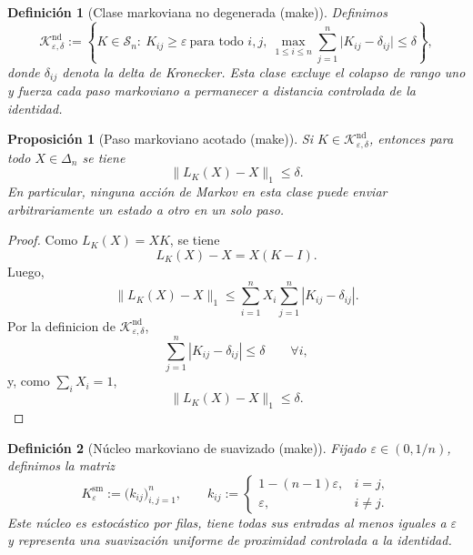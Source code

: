 ﻿\documentclass[12pt]{article}
\newcommand{\fuente}[1]{\textnormal{(#1)}}
\newtheorem{definicion}{Definición}[section]
\newtheorem{proposicion}{Proposición}[section]
\begin{document}
\begin{definicion}[Clase markoviana no degenerada \fuente{make}]
Definimos
\[
\mathcal K_{\varepsilon,\delta}^{\mathrm{nd}}
:=
\left\{
K\in\mathcal S_n:\ 
K_{ij}\ge \varepsilon\ \text{para todo }i,j,
\ \max_{1\le i\le n}\sum_{j=1}^n \bigl|K_{ij}-\delta_{ij}\bigr|\le \delta
\right\},
\]
donde \(\delta_{ij}\) denota la delta de Kronecker. Esta clase excluye el colapso de rango uno y fuerza cada paso markoviano a permanecer a distancia controlada de la identidad.
\end{definicion}

\begin{proposicion}[Paso markoviano acotado \fuente{make}]
Si \(K\in\mathcal K_{\varepsilon,\delta}^{\mathrm{nd}}\), entonces para todo \(X\in\Delta_n\) se tiene
\[
\|L_K(X)-X\|_1\le \delta.
\]
En particular, ninguna acción de Markov en esta clase puede enviar arbitrariamente un estado a otro en un solo paso.
\end{proposicion}

\begin{proof}
Como \(L_K(X)=XK\), se tiene
\[
L_K(X)-X=X(K-I).
\]
Luego,
\[
\|L_K(X)-X\|_1
\le
\sum_{i=1}^n X_i\sum_{j=1}^n |K_{ij}-\delta_{ij}|.
\]
Por la definicion de \(\mathcal K_{\varepsilon,\delta}^{\mathrm{nd}}\),
\[
\sum_{j=1}^n |K_{ij}-\delta_{ij}|\le \delta
\qquad \forall i,
\]
y, como \(\sum_i X_i=1\),
\[
\|L_K(X)-X\|_1\le \delta.
\]
\end{proof}

\begin{definicion}[Núcleo markoviano de suavizado \fuente{make}]
Fijado \(\varepsilon\in(0,1/n)\), definimos la matriz
\[
K_\varepsilon^{\mathrm{sm}}
:=
\bigl(k_{ij}\bigr)_{i,j=1}^n,
\qquad
k_{ij}:=
\begin{cases}
1-(n-1)\varepsilon, & i=j,\\
\varepsilon, & i\neq j.
\end{cases}
\]
Este núcleo es estocástico por filas, tiene todas sus entradas al menos iguales a \(\varepsilon\) y representa una suavización uniforme de proximidad controlada a la identidad.
\end{definicion}
\end{document}
